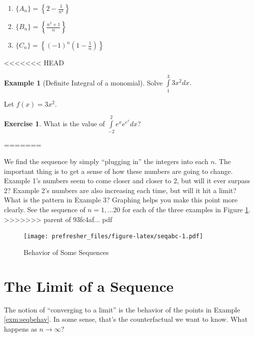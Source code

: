 \documentclass[]{book}
\providecommand{\tightlist}{%
  \setlength{\itemsep}{0pt}\setlength{\parskip}{0pt}}
\theoremstyle{definition}
\theoremstyle{definition}
\newtheorem{example}{Example}[chapter]
\theoremstyle{definition}
\newtheorem{exercise}{Exercise}[chapter]
\theoremstyle{remark}
\begin{document}
\begin{enumerate}
\def\labelenumi{\arabic{enumi}.}
\tightlist
\item
  \(\{A_n\}=\left\{ 2-\frac{1}{n^2} \right\}\)
\item
  \(\{B_n\}=\left\{\frac{n^2+1}{n} \right\}\)
\item
  \(\{C_n\}=\left\{(-1)^n \left(1-\frac{1}{n}\right) \right\}\)
\end{enumerate}
<<<<<<< HEAD

\begin{example}[Definite Integral of a monomial]
\protect\hypertarget{exm:defintmon}{}{\label{exm:defintmon} {} }Solve \(\int\limits_1^3 3x^2 dx.\)

Let \(f(x) = 3x^2\).
\end{example}

\begin{exercise}
\protect\hypertarget{exr:unnamed-chunk-29}{}{\label{exr:unnamed-chunk-29} }What is the value of \(\int\limits_{-2}^2 e^x e^{e^x} dx\)?
\end{exercise}
=======

We find the sequence by simply ``plugging in'' the integers into each \(n\). The important thing is to get a sense of how these numbers are going to change. Example 1's numbers seem to come closer and closer to 2, but will it ever surpass 2? Example 2's numbers are also increasing each time, but will it hit a limit? What is the pattern in Example 3? Graphing helps you make this point more clearly. See the sequence of \(n = 1, ...20\) for each of the three examples in Figure \ref{fig:seqabc}.
>>>>>>> parent of 93fc4af... pdf

\begin{figure}
\centering
\texttt{[image: prefresher\_files/figure-latex/seqabc-1.pdf]}
\caption{\label{fig:seqabc}Behavior of Some Sequences}
\end{figure}

\hypertarget{the-limit-of-a-sequence}{%
\section{The Limit of a Sequence}\label{the-limit-of-a-sequence}}

The notion of ``converging to a limit'' is the behavior of the points in Example \ref{exm:seqbehav}. In some sense, that's the counterfactual we want to know. What happens as \(n\rightarrow \infty\)?
\end{document}
